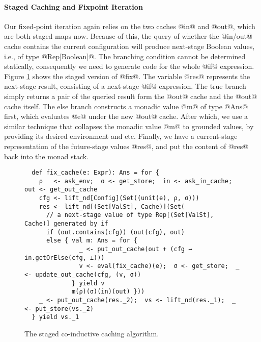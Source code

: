 \paragraph{Staged Caching and Fixpoint Iteration} Our fixed-point iteration
again relies on the two caches @in@ and @out@, which are both staged maps now.
Because of this, the query of whether the @in/out@ cache contains the current
configuration will produce next-stage Boolean values, i.e., of type
@Rep[Boolean]@. The branching condition cannot be determined
statically, consequently we need to generate code for the whole @if@ expression. Figure
\ref{fig:staged_coind_cache} shows the staged version of @fix@. The
variable @res@ represents the next-stage result, consisting of a next-stage
@if@ expression. The true branch simply returns a pair of the queried result
form the @out@ cache and the @out@ cache itself. The else branch constructs a
monadic value @m@ of type @Ans@ first, which evaluates @e@ under the new @out@
cache.  After which, we use a similar technique that collapses the monadic
value @m@ to grounded values, by providing its desired environment and etc.
Finally, we have a current-stage representation of the future-stage values
@res@, and put the content of @res@ back into the monad stack.

\begin{figure}[t]
\centering
\begin{lstlisting}
  def fix_cache(e: Expr): Ans = for {
    ρ   <- ask_env;  σ <- get_store;  in <- ask_in_cache;  out <- get_out_cache
    cfg <- lift_nd[Config](Set((unit(e), ρ, σ)))
    res <- lift_nd[(Set[ValSt], Cache)](Set(
      // a next-stage value of type Rep[(Set[ValSt], Cache)] generated by if
      if (out.contains(cfg)) (out(cfg), out)
      else { val m: Ans = for {
               _ <- put_out_cache(out + (cfg → in.getOrElse(cfg, ⊥)))
               v <- eval(fix_cache)(e);  σ <- get_store;  _ <- update_out_cache(cfg, (v, σ))
             } yield v
             m(ρ)(σ)(in)(out) }))
    _ <- put_out_cache(res._2);  vs <- lift_nd(res._1);  _ <- put_store(vs._2)
  } yield vs._1
\end{lstlisting}
\caption{The staged co-inductive caching algorithm.}
\label{fig:staged_coind_cache}
\vspace{-1.5em}
\end{figure}

